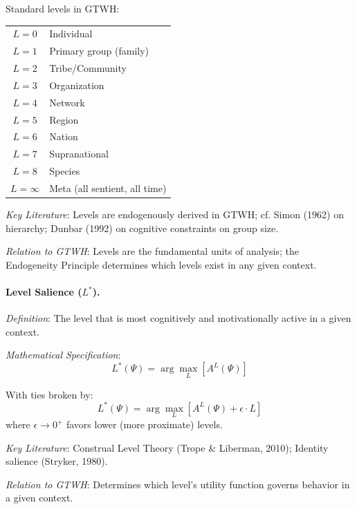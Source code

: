 \documentclass[12pt,a4paper]{article}
\begin{document}
Standard levels in GTWH:
\begin{center}
\begin{tabular}{cl}
$L = 0$ & Individual \\
$L = 1$ & Primary group (family) \\
$L = 2$ & Tribe/Community \\
$L = 3$ & Organization \\
$L = 4$ & Network \\
$L = 5$ & Region \\
$L = 6$ & Nation \\
$L = 7$ & Supranational \\
$L = 8$ & Species \\
$L = \infty$ & Meta (all sentient, all time)
\end{tabular}
\end{center}

\textit{Key Literature}: Levels are endogenously derived in GTWH; cf. Simon (1962) 
on hierarchy; Dunbar (1992) on cognitive constraints on group size.

\textit{Relation to GTWH}: Levels are the fundamental units of analysis; the 
Endogeneity Principle determines which levels exist in any given context.

\medskip

\paragraph{Level Salience ($L^*$).}
\textit{Definition}: The level that is most cognitively and motivationally 
active in a given context.

\textit{Mathematical Specification}:
\begin{equation}
L^*(\Psi) = \arg\max_L \left[A^L(\Psi)\right]
\end{equation}

With ties broken by:
\begin{equation}
L^*(\Psi) = \arg\max_L \left[A^L(\Psi) + \epsilon \cdot L\right]
\end{equation}
where $\epsilon \to 0^+$ favors lower (more proximate) levels.

\textit{Key Literature}: Construal Level Theory (Trope \& Liberman, 2010); 
Identity salience (Stryker, 1980).

\textit{Relation to GTWH}: Determines which level's utility function governs 
behavior in a given context.

\end{document}
